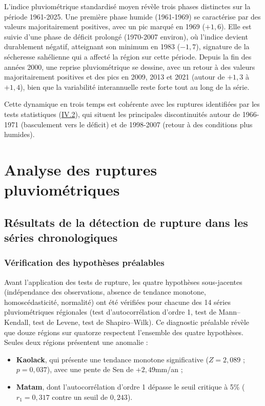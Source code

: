 \documentclass[12pt,a4paper]{report}
\begin{document}
L'indice pluviométrique standardisé moyen révèle trois phases distinctes sur la période 1961-2025. Une première phase humide (1961-1969) se caractérise par des valeurs majoritairement positives, avec un pic marqué en 1969 ($+1{,}6$). Elle est suivie d'une phase de déficit prolongé (1970-2007 environ), où l'indice devient durablement négatif, atteignant son minimum en 1983 ($-1{,}7$), signature de la sécheresse sahélienne qui a affecté la région sur cette période. Depuis la fin des années 2000, une reprise pluviométrique se dessine, avec un retour à des valeurs majoritairement positives et des pics en 2009, 2013 et 2021 (autour de $+1{,}3$ à $+1{,}4$), bien que la variabilité interannuelle reste forte tout au long de la série.

Cette dynamique en trois temps est cohérente avec les ruptures identifiées par les tests statistiques (\hyperref[sec:analyse-ruptures]{IV.2}), qui situent les principales discontinuités autour de 1966-1971 (basculement vers le déficit) et de 1998-2007 (retour à des conditions plus humides).

\section{Analyse des ruptures pluviométriques}
\label{sec:analyse-ruptures}

\subsection{Résultats de la détection de rupture dans les séries chronologiques}
\label{sec:resultats-detection-ruptures}

\subsubsection*{Vérification des hypothèses préalables}

Avant l'application des tests de rupture, les quatre hypothèses sous-jacentes (indépendance des observations, absence de tendance monotone, homoscédasticité, normalité) ont été vérifiées pour chacune des 14 séries pluviométriques régionales (test d'autocorrélation d'ordre 1, test de Mann--Kendall, test de Levene, test de Shapiro--Wilk). Ce diagnostic préalable révèle que douze régions sur quatorze respectent l'ensemble des quatre hypothèses. Seules deux régions présentent une anomalie :
\begin{itemize}
  \item \textbf{Kaolack}, qui présente une tendance monotone significative ($Z = 2{,}089$ ; $p = 0{,}037$), avec une pente de Sen de $+2{,}49$mm/an ;
  \item \textbf{Matam}, dont l'autocorrélation d'ordre 1 dépasse le seuil critique à 5\% ($r_1 = 0{,}317$ contre un seuil de $0{,}243$).
\end{itemize}
\end{document}
